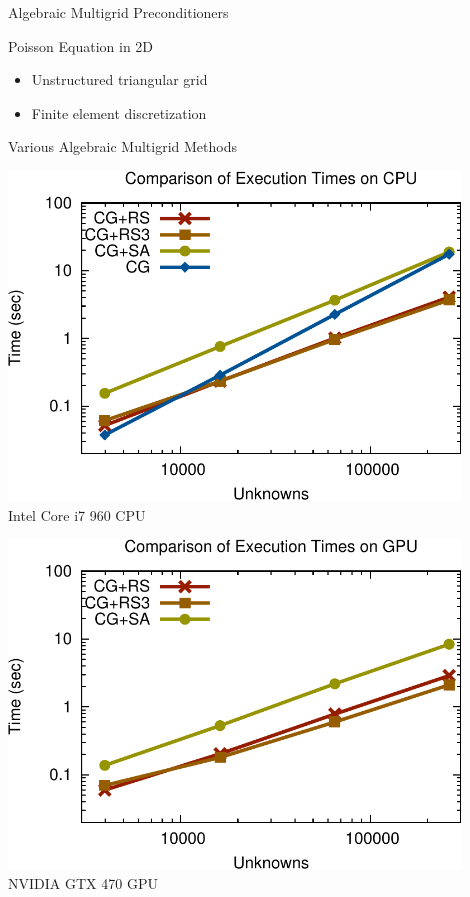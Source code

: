 \begin{frame}{Algebraic Multigrid Preconditioners}

  \begin{block}{Poisson Equation in 2D}
    \begin{itemize}
     \item Unstructured triangular grid
     \item Finite element discretization
    \end{itemize}
  \end{block}

 \begin{block}{Various Algebraic Multigrid Methods}
  \vspace*{0.3cm}
  \begin{minipage}{0.48\textwidth}
  \begin{center}
   \includegraphics[width=0.9\textwidth]{figures/cpu_scaling-2.pdf}\\
   Intel Core i7 960 CPU
  \end{center}
  \end{minipage}
  \begin{minipage}{0.48\textwidth}
  \begin{center}
   \includegraphics[width=0.9\textwidth]{figures/gpu_scaling-1.pdf}\\
   NVIDIA GTX 470 GPU
  \end{center}
  \end{minipage}
 \end{block}


\end{frame}
